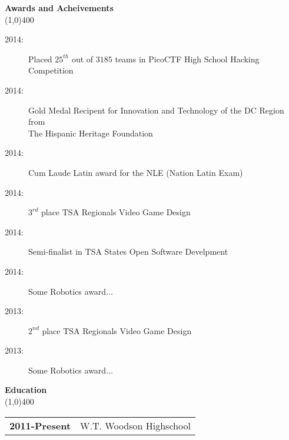 \documentclass[7pt]{report}
\begin{document}
{\bf {\Large Awards and Acheivements}} \\
\line(1,0){400} \\
\begin{description}
	\item[2014:] Placed $25^{th}$ out of $3185$ teams in PicoCTF High School Hacking Competition
	\item[2014:] Gold Medal Recipent for Innovation and Technology of the DC Region from\\ The Hispanic Heritage Foundation
	\item[2014:] Cum Laude Latin award for the NLE (Nation Latin Exam)
	\item[2014:] $3^{rd}$ place TSA Regionals Video Game Design
	\item[2014:] Semi-finalist in TSA States Open Software Develpment
	\item[2014:] Some Robotics award...
	\item[2013:] $2^{nd}$ place TSA Regionals Video Game Design
	\item[2013:] Some Robotics award...
\end{description}

{\bf {\Large Education}} \\
\line(1,0){400} \\
\begin{tabular}{r|l}
	{\bf 2011-Present} & W.T. Woodson Highschool 
\end{tabular}
\end{document}
